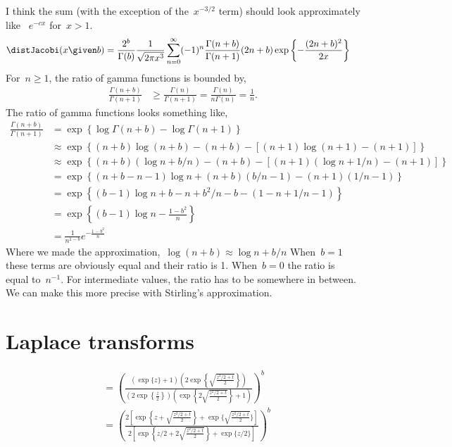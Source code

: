 I think the sum (with the exception of the~$x^{-3/2}$ term) should look approximately like
~$e^{-cx}$ for~$x>1$. 
\begin{align}
  \distJacobi(x \given b) &= \frac{2^b}{\Gamma(b)} \frac{1}{\sqrt{2\pi x^3}}
  \sum_{n=0}^\infty (-1)^n \frac{\Gamma(n+b)}{\Gamma(n+1)} (2n+b)
  \exp\left\{- \frac{(2n+b)^2}{2x} \right\} 
\end{align}
For~$n \geq 1$, the ratio of gamma functions is bounded by,
\begin{align}
\frac{\Gamma(n+b)}{\Gamma(n+1)} &\geq \frac{\Gamma(n)}{\Gamma(n+1)} 
= \frac{\Gamma(n)}{n\Gamma(n)} = \frac{1}{n}.
\end{align}
The ratio of gamma functions looks something like, 
\begin{align}
\frac{\Gamma(n+b)}{\Gamma(n+1)} &= \exp\left\{ \log \Gamma(n+b) - \log \Gamma(n+1) \right\} \\
&\approx \exp \left\{ (n+b) \log (n+b) - (n+b) - [(n+1)\log(n+1) -(n+1)] \right\} \\
&\approx \exp \left\{ (n+b) (\log n + b/n) - (n+b) - [(n+1) (\log n + 1/n)  -(n+1)] \right\} \\
&= \exp \left\{ (n+b-n-1) \log n + (n+b)(b/n-1)  - (n+1)(1/n -1) \right\} \\
&= \exp \left\{ (b-1) \log n + b -n +b^2/n -b - (1 -n + 1/n -1  )   \right\} \\
&= \exp \left\{ (b-1) \log n - \frac{1-b^2}{n}   \right\} \\
&= \frac{1}{n^{1-b}} e^{-\frac{1-b^2}{n}}
\end{align}
Where we made the approximation,~$\log(n+b) \approx \log n + b/n$
When~$b=1$ these terms are obviously equal and their ratio is 1. 
When~$b=0$ the ratio is equal to~$n^{-1}$. For intermediate values,
the ratio has to be somewhere in between. 
We can make this more precise with Stirling's approximation.

\section{Laplace transforms}
\begin{align}
  &= 
\left( \frac{
\left(\exp \{z \}+1 \right) 
\left( 2 \exp \left\{ \sqrt{\frac{z^2/2 +t}{2}}\right\} \right)}  
{ \left( 2 \exp \left\{ \frac{z}{2} \right\}\right) 
\left(\exp \left\{ 2\sqrt{\frac{z^2/2 +t}{2}}\right\}+1 \right)}
\right)^b \\
  &= \left(   \frac{
2 \left[\exp \left\{ z+ \sqrt{\frac{z^2/2 +t}{2}}\right\} + \exp \{\sqrt{\frac{z^2/2 +t}{2}} \} \right]}
{ 
2 \left[\exp \left\{ z/2+ 2\sqrt{\frac{z^2/2 +t}{2}}\right\} + \exp \{z/2 \} \right]
}
\right)^b
\end{align}
